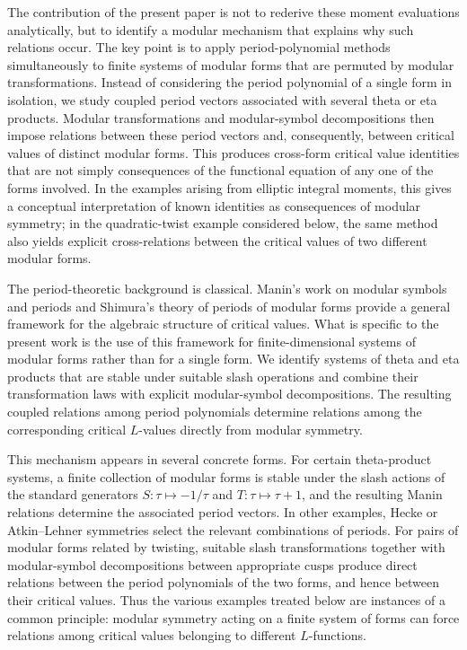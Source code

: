 \documentclass[preprint,12pt]{elsarticle}
\theoremstyle{definition}
\theoremstyle{remark}
\begin{document}
The contribution of the present paper is not to rederive these moment
evaluations analytically, but to identify a modular mechanism that explains
why such relations occur. The key point is to apply period-polynomial methods
simultaneously to finite systems of modular forms that are permuted by modular
transformations. Instead of considering the period polynomial of a single
form in isolation, we study coupled period vectors associated with several
theta or eta products. Modular transformations and modular-symbol
decompositions then impose relations between these period vectors and,
consequently, between critical values of distinct modular forms. This produces
cross-form critical value identities that are not simply consequences of the
functional equation of any one of the forms involved. In the examples arising
from elliptic integral moments, this gives a conceptual interpretation of
known identities as consequences of modular symmetry; in the quadratic-twist
example considered below, the same method also yields explicit cross-relations
between the critical values of two different modular forms.

The period-theoretic background is classical. Manin's work on modular symbols
and periods \cite{MR314846,MR345909} and Shimura's theory of periods of modular
forms \cite{MR463119} provide a general framework for the algebraic structure
of critical values. What is specific to the present work is the use of this
framework for finite-dimensional systems of modular forms rather than for a
single form. We identify systems of theta and eta products that are stable
under suitable slash operations and combine their transformation laws with
explicit modular-symbol decompositions. The resulting coupled relations among
period polynomials determine relations among the corresponding critical
$L$-values directly from modular symmetry.

This mechanism appears in several concrete forms. For certain theta-product
systems, a finite collection of modular forms is stable under the slash
actions of the standard generators $S:\tau\mapsto-1/\tau$ and
$T:\tau\mapsto\tau+1$, and the resulting Manin relations determine the
associated period vectors. In other examples, Hecke or Atkin--Lehner
symmetries select the relevant combinations of periods. For pairs of modular
forms related by twisting, suitable slash transformations together with
modular-symbol decompositions between appropriate cusps produce direct
relations between the period polynomials of the two forms, and hence between
their critical values. Thus the various examples treated below are instances
of a common principle: modular symmetry acting on a finite system of forms can
force relations among critical values belonging to different $L$-functions.
\end{document}
